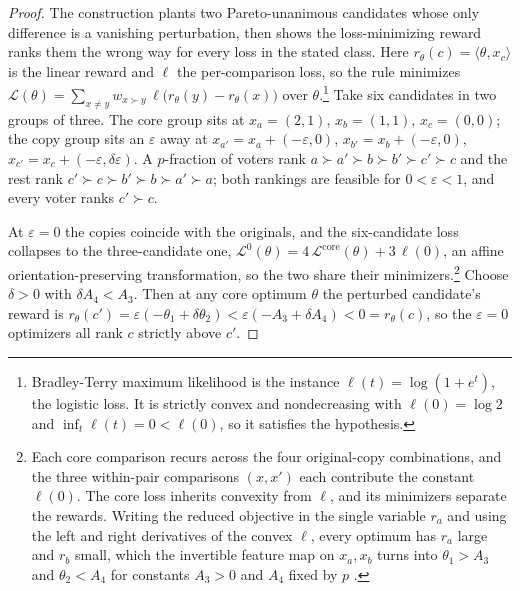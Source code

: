 \begin{proof}
The construction plants two Pareto-unanimous candidates whose only difference is a vanishing perturbation, then shows the loss-minimizing reward ranks them the wrong way for every loss in the stated class. Here $r_\theta(c) = \langle \theta, x_c \rangle$ is the linear reward and $\ell$ the per-comparison loss, so the rule minimizes $\mathcal{L}(\theta) = \sum_{x \neq y} w_{x \succ y}\, \ell\big(r_\theta(y) - r_\theta(x)\big)$ over $\theta$.\footnote{Bradley-Terry maximum likelihood is the instance $\ell(t) = \log(1 + e^{t})$, the logistic loss. It is strictly convex and nondecreasing with $\ell(0) = \log 2$ and $\inf_t \ell(t) = 0 < \ell(0)$, so it satisfies the hypothesis.} Take six candidates in two groups of three. The core group sits at $x_a = (2,1)$, $x_b = (1,1)$, $x_c = (0,0)$; the copy group sits an $\varepsilon$ away at $x_{a'} = x_a + (-\varepsilon, 0)$, $x_{b'} = x_b + (-\varepsilon, 0)$, $x_{c'} = x_c + (-\varepsilon, \delta\varepsilon)$. A $p$-fraction of voters rank $a \succ a' \succ b \succ b' \succ c' \succ c$ and the rest rank $c' \succ c \succ b' \succ b \succ a' \succ a$; both rankings are feasible for $0 < \varepsilon < 1$, and every voter ranks $c' \succ c$.

At $\varepsilon = 0$ the copies coincide with the originals, and the six-candidate loss collapses to the three-candidate one, $\mathcal{L}^{0}(\theta) = 4\,\mathcal{L}^{\mathrm{core}}(\theta) + 3\,\ell(0)$, an affine orientation-preserving transformation, so the two share their minimizers.\footnote{Each core comparison recurs across the four original-copy combinations, and the three within-pair comparisons $(x, x')$ each contribute the constant $\ell(0)$. The core loss inherits convexity from $\ell$, and its minimizers separate the rewards. Writing the reduced objective in the single variable $r_a$ and using the left and right derivatives of the convex $\ell$, every optimum has $r_a$ large and $r_b$ small, which the invertible feature map on $x_a, x_b$ turns into $\theta_1 > A_3$ and $\theta_2 < A_4$ for constants $A_3 > 0$ and $A_4$ fixed by $p$ \citep[Lemmas~3.2--3.3]{ge2024axioms}.} Choose $\delta > 0$ with $\delta A_4 < A_3$. Then at any core optimum $\theta$ the perturbed candidate's reward is $r_\theta(c') = \varepsilon(-\theta_1 + \delta\theta_2) < \varepsilon(-A_3 + \delta A_4) < 0 = r_\theta(c)$, so the $\varepsilon = 0$ optimizers all rank $c$ strictly above $c'$.


\end{proof}
